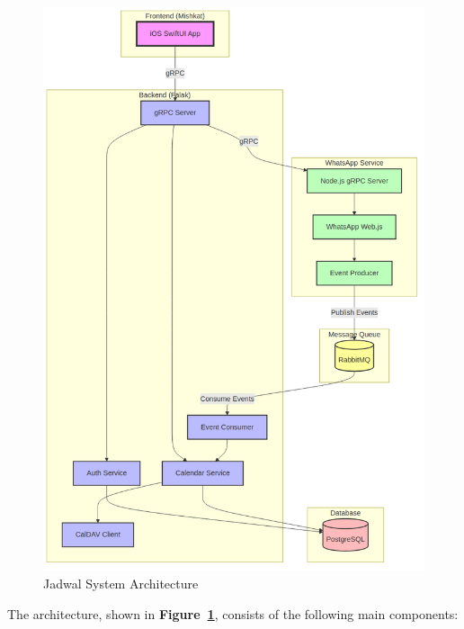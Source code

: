\documentclass[12pt,a4paper,twoside]{report}
\begin{document}
\begin{figure}[!h]
    \centering
    \includegraphics[width=\textwidth]{images/architecture.png}
    \caption{Jadwal System Architecture}
    \label{fig:architecture}
\end{figure}

The architecture, shown in \textbf{Figure~\ref{fig:architecture}}, consists of the following main components:
\end{document}
